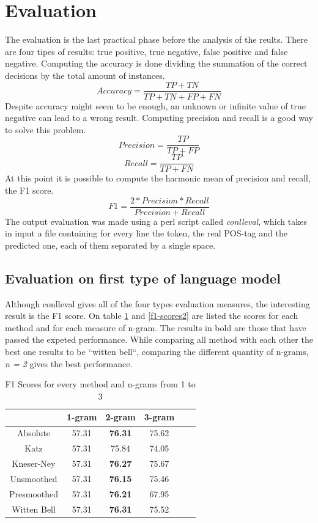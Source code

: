 \documentclass[11pt,a4paper]{article}
\begin{document}
\section{Evaluation}%
The evaluation is the last practical phase before the analysis of the reults. There are four tipes of results: true positive, true negative, false positive and false negative. Computing the accuracy is done dividing the summation of the correct decisions by the total amount of instances.
\begin{equation}
Accuracy= \frac{TP + TN} {TP + TN + FP + FN}
\end{equation}
Despite accuracy might seem to be enough, an unknown or infinite value of true negative can lead to a wrong result. Computing precision and recall is a good way to solve this problem.
\begin{equation}
Precision = \frac{TP} {TP + FP}
\end{equation}
\begin{equation}
Recall = \frac{TP}{TP + FN}
\end{equation}
 At this point it is possible to compute the harmonic mean of precision and recall, the F1 score.
 \begin{equation}
F1 =  \frac{2 * Precision * Recall}{Precision + Recall} 
\end{equation}
The output evaluation was made using a perl script called \textit{conlleval}, which takes in input a file containing for every line the token, the real POS-tag and the predicted one, each of them separated by a single space.
\subsection*{Evaluation on first type of language model}
Although conlleval gives all of the four types evaluation measures, the interesting result is the F1 score. On table \ref{f1-scores1} and \ref{f1-scores2} are listed the scores for each method and for each measure of n-gram. The results in bold are those that have passed the expeted performance. While comparing all method with each other the best one results to be ``witten bell``, comparing the different quantity of n-grams, \textit{n = 2} gives the best performance.
\begin{table}[ht]
\begin{center}
\begin{tabular}{|c|c|c|c|c|c|}
\hline
 & 1-gram & 2-gram & 3-gram \\ \hline
Absolute & 57.31 & \textbf{76.31} & 75.62  \\ \hline
Katz & 57.31 & 75.84 & 74.05 \\ \hline
Kneser-Ney & 57.31 & \textbf{76.27} & 75.67 \\ \hline
Unsmoothed & 57.31 & \textbf{76.15} & 75.46 \\ \hline
Presmoothed & 57.31 & \textbf{76.21} & 67.95 \\ \hline
Witten Bell & 57.31 & \textbf{76.31} & 75.52 \\ \hline
\end{tabular}
\caption{F1 Scores for every method and n-grams from 1 to 3}
\label{f1-scores1}
\end{center}
\end{table}
\end{document}
